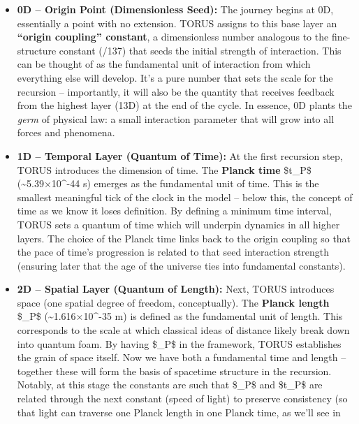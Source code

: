 \documentclass[
]{article}
\begin{document}
\begin{itemize}
\item
  \textbf{0D -- Origin Point (Dimensionless Seed):} The journey begins
  at 0D, essentially a point with no extension. TORUS assigns to this
  base layer an \textbf{``origin coupling'' constant}, a dimensionless
  number analogous to the fine-structure constant (/137) that seeds
  the initial strength of interaction\hspace{0pt}. This can be thought
  of as the fundamental unit of interaction from which everything else
  will develop. It's a pure number that sets the scale for the recursion
  -- importantly, it will also be the quantity that receives feedback
  from the highest layer (13D) at the end of the cycle. In essence, 0D
  plants the \emph{germ} of physical law: a small interaction parameter
  that will grow into all forces and phenomena.
\item
  \textbf{1D -- Temporal Layer (Quantum of Time):} At the first
  recursion step, TORUS introduces the dimension of time. The
  \textbf{Planck time} \$t\_P\$ (\textasciitilde5.39×10\^{}-44 s)
  emerges as the fundamental unit of time\hspace{0pt}. This is the
  smallest meaningful tick of the clock in the model -- below this, the
  concept of time as we know it loses definition. By defining a minimum
  time interval, TORUS sets a quantum of time which will underpin
  dynamics in all higher layers. The choice of the Planck time links
  back to the origin coupling so that the pace of time's progression is
  related to that seed interaction strength (ensuring later that the age
  of the universe ties into fundamental constants).
\item
  \textbf{2D -- Spatial Layer (Quantum of Length):} Next, TORUS
  introduces space (one spatial degree of freedom, conceptually). The
  \textbf{Planck length} \$\ell\_P\$ (\textasciitilde1.616×10\^{}-35 m) is
  defined as the fundamental unit of length\hspace{0pt}. This
  corresponds to the scale at which classical ideas of distance likely
  break down into quantum foam. By having \$\ell\_P\$ in the framework,
  TORUS establishes the grain of space itself. Now we have both a
  fundamental time and length -- together these will form the basis of
  spacetime structure in the recursion. Notably, at this stage the
  constants are such that \$\ell\_P\$ and \$t\_P\$ are related through the
  next constant (speed of light) to preserve consistency (so that light
  can traverse one Planck length in one Planck time, as we'll see in

\end{itemize}
\end{document}
